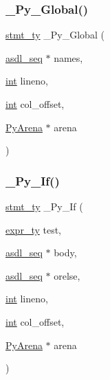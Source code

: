 \mbox{\label{_python-ast_8h_a7070f4e0f5c60bfcaaa0ca6b0c42c840}} 
\subsubsection{\texorpdfstring{\_Py\_Global()}{\_Py\_Global()}}
{\footnotesize\ttfamily \mbox{\hyperlink{_python-ast_8h_a39618071027b661bc03e8916e664e1a7}{stmt\+\_\+ty}} \+\_\+\+Py\+\_\+\+Global (\begin{DoxyParamCaption}\item[{\mbox{\hyperlink{structasdl__seq}{asdl\+\_\+seq}} $\ast$}]{names,  }\item[{\mbox{\hyperlink{warnings_8h_a74f207b5aa4ba51c3a2ad59b219a423b}{int}}}]{lineno,  }\item[{\mbox{\hyperlink{warnings_8h_a74f207b5aa4ba51c3a2ad59b219a423b}{int}}}]{col\+\_\+offset,  }\item[{\mbox{\hyperlink{pyarena_8h_a9edeb357fbb27333471022a0975adb7a}{Py\+Arena}} $\ast$}]{arena }\end{DoxyParamCaption})}

\mbox{\label{_python-ast_8h_a4576b4b5b479fe67421c45bc1fcab077}} 
\subsubsection{\texorpdfstring{\_Py\_If()}{\_Py\_If()}}
{\footnotesize\ttfamily \mbox{\hyperlink{_python-ast_8h_a39618071027b661bc03e8916e664e1a7}{stmt\+\_\+ty}} \+\_\+\+Py\+\_\+\+If (\begin{DoxyParamCaption}\item[{\mbox{\hyperlink{_python-ast_8h_a56d3705e020a071405094a220c4592bd}{expr\+\_\+ty}}}]{test,  }\item[{\mbox{\hyperlink{structasdl__seq}{asdl\+\_\+seq}} $\ast$}]{body,  }\item[{\mbox{\hyperlink{structasdl__seq}{asdl\+\_\+seq}} $\ast$}]{orelse,  }\item[{\mbox{\hyperlink{warnings_8h_a74f207b5aa4ba51c3a2ad59b219a423b}{int}}}]{lineno,  }\item[{\mbox{\hyperlink{warnings_8h_a74f207b5aa4ba51c3a2ad59b219a423b}{int}}}]{col\+\_\+offset,  }\item[{\mbox{\hyperlink{pyarena_8h_a9edeb357fbb27333471022a0975adb7a}{Py\+Arena}} $\ast$}]{arena }\end{DoxyParamCaption})}

